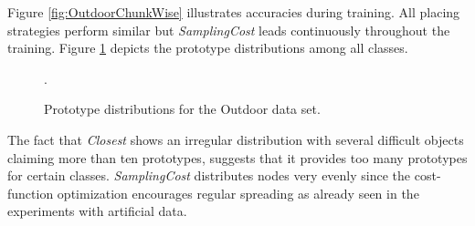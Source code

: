 \documentclass[conference]{IEEEtran}
\begin{document}
Figure \ref{fig:OutdoorChunkWise} illustrates accuracies during training.
All placing strategies perform similar but \textit{SamplingCost} leads continuously throughout the training.
Figure \ref{fig:OutdoorHist} depicts the prototype distributions among all classes. 
\begin{figure}
        \centering
        \vspace{0 pt}
	\vspace{0 pt}
        \vspace{0 pt}
	\vspace{0 pt}
        \caption{Prototype distributions for the Outdoor data set.}.
        \label{fig:OutdoorHist}
\end{figure}
The fact that \textit{Closest} shows an irregular distribution with several difficult objects claiming more than ten prototypes,
suggests that it provides too many prototypes for certain classes. 
\textit{SamplingCost} distributes nodes very evenly since the cost-function optimization encourages regular spreading as already seen in the 
experiments with artificial data.\\
\end{document}
